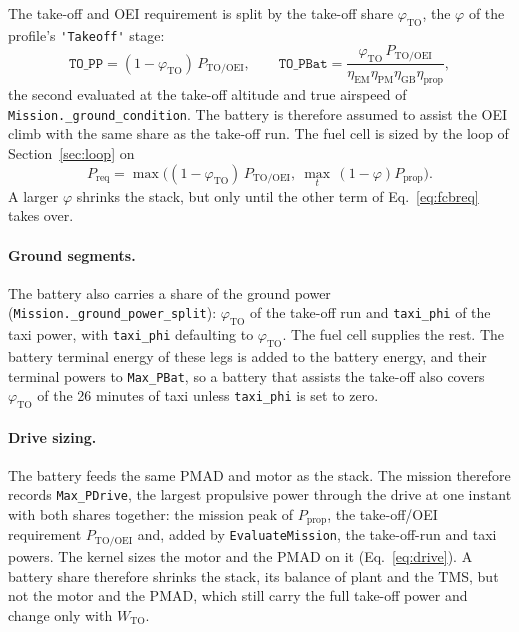 \documentclass[a4paper,11pt]{article}
\newcommand{\code}[1]{\nolinkurl{#1}}
\newcommand{\fn}[1]{\nolinkurl{#1}}
\begin{document}
The take-off and OEI requirement is split by the take-off share $\varphi_\mathrm{TO}$, the
$\varphi$ of the profile's \code{'Takeoff'} stage:
\begin{equation}
  \mathtt{TO\_PP} = (1-\varphi_\mathrm{TO})\,P_\mathrm{TO/OEI}, \qquad
  \mathtt{TO\_PBat} = \frac{\varphi_\mathrm{TO}\,P_\mathrm{TO/OEI}}
  {\eta_\mathrm{EM}\eta_\mathrm{PM}\eta_\mathrm{GB}\eta_\mathrm{prop}},
\end{equation}
the second evaluated at the take-off altitude and true airspeed of
\fn{Mission._ground_condition}.
The battery is therefore assumed to assist the OEI climb with the same share as the take-off
run. The fuel cell is sized by the loop of Section~\ref{sec:loop} on
\begin{equation}
  P_\mathrm{req} = \max\!\Big((1-\varphi_\mathrm{TO})\,P_\mathrm{TO/OEI},\ \max_t\,(1-\varphi)P_\mathrm{prop}\Big).
  \label{eq:fcbreq}
\end{equation}
A larger $\varphi$ shrinks the stack, but only until the other term of Eq.~\eqref{eq:fcbreq}
takes over.

\paragraph{Ground segments.} The battery also carries a share of the ground power
(\fn{Mission._ground_power_split}): $\varphi_\mathrm{TO}$ of the take-off run and
\code{taxi_phi} of the taxi power, with \code{taxi_phi} defaulting to $\varphi_\mathrm{TO}$.
The fuel cell supplies the rest. The battery terminal energy of these legs is added to the
battery energy, and their terminal powers to \code{Max_PBat}, so a battery that assists the
take-off also covers $\varphi_\mathrm{TO}$ of the 26 minutes of taxi unless \code{taxi_phi} is
set to zero.

\paragraph{Drive sizing.} The battery feeds the same PMAD and motor as the stack. The mission
therefore records \code{Max_PDrive}, the largest propulsive power through the drive at one
instant with both shares together: the mission peak of $P_\mathrm{prop}$, the take-off/OEI
requirement $P_\mathrm{TO/OEI}$ and, added by \fn{EvaluateMission}, the take-off-run and taxi
powers. The kernel sizes the motor and the PMAD on it (Eq.~\eqref{eq:drive}). A battery share
therefore shrinks the stack, its balance of plant and the TMS, but not the motor and the PMAD,
which still carry the full take-off power and change only with $W_\mathrm{TO}$.
\end{document}
